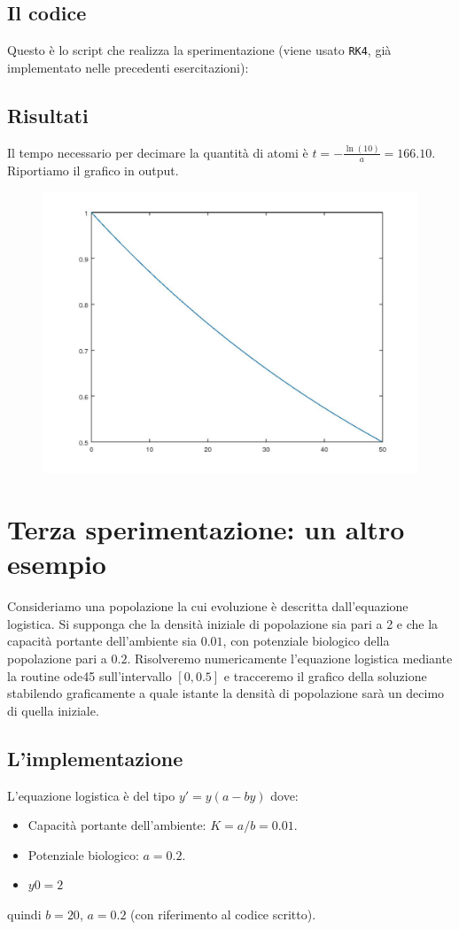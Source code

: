 \documentclass{article}
\begin{document}
	\subsection{Il codice}
	Questo è lo script che realizza la sperimentazione (viene usato {\tt RK4}, già implementato nelle precedenti esercitazioni):
	
	\subsection{Risultati}
	Il tempo necessario per decimare la quantità di atomi è $t=-\frac{\ln(10)}{a}=166.10$.
	Riportiamo il grafico in output.
	\begin{figure}[htp!]
		\centering 
		\includegraphics[width=\textwidth]{3_2.jpeg}
	\end{figure}
	
	\section{Terza sperimentazione: un altro esempio}
	Consideriamo una popolazione la cui evoluzione è descritta dall’equazione logistica. Si supponga che la densità iniziale di popolazione sia pari a 2 e che la capacità portante
	dell’ambiente sia $0.01$, con potenziale biologico della popolazione pari a $0.2$. Risolveremo numericamente l’equazione logistica mediante la routine ode45 sull’intervallo $\left[0, 0.5\right]$ e tracceremo il grafico della soluzione stabilendo graficamente a quale istante la densità di popolazione sarà un decimo di quella iniziale.

	\subsection{L'implementazione}
	L'equazione logistica è del tipo $y'=y(a-by)$ dove:
	\begin{itemize}
		\item Capacità portante dell'ambiente: $K=a/b=0.01$.
		\item Potenziale biologico: $a=0.2$.
		\item $y0=2$
	\end{itemize} 
	quindi $b=20$, $a=0.2$ (con riferimento al codice scritto).
	
\end{document}
